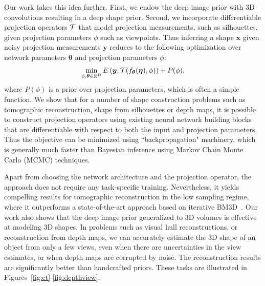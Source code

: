 Our work takes this idea further. First, we endow the deep image prior
with 3D convolutions resulting in a deep shape prior.
Second, we incorporate differentiable projection operators ${\cal T}$ that model
projection measurements, such as silhouettes, given projection
parameters $\phi$ such as viewpoints.
Thus inferring a shape $\bm{x}$ given noisy projection measurements
$\bm{y}$ reduces to the following optimization over network parameters
$\bm{\theta}$ and projection parameters $\phi$:
\begin{equation}
\label{eq:maineq}
	\min_{\phi, \bm{\theta} \in \mathbb{R}^D} E\left(\bm{y}, {\cal T}(f_{\bm{\theta}}(\bm{\eta}), \phi)\right) + P(\phi), 
\end{equation}
where $P(\phi)$ is a prior over projection parameters, which is often
a simple function. We show that for a number of shape construction
problems such as tomographic reconstruction, shape from silhouettes or
depth maps, it is possible to construct projection operators using
existing neural network building blocks that are differentiable with
respect to both the input and projection parameters.
Thus the objective can be minimized using ``backpropagation" machinery, 
which is generally much faster than Bayesian inference using Markov
Chain Monte Carlo (MCMC) techniques.




Apart from choosing the network architecture and the projection
operator, the approach does not require any task-specific training.
Nevertheless, it yields compelling results for tomographic
reconstruction in the low sampling regime, where it outperforms a
state-of-the-art approach based on iterative
BM3D~\cite{maggioni2013nonlocal}.
Our work also shows that the deep image prior generalized to 3D
volumes is effective at modeling 3D shapes.
In problems such as visual hull reconstructions, or reconstruction from
depth maps, we can accurately estimate the 3D shape of an object from
only a few views, even when there are uncertainties in the view
estimates, or when depth maps are corrupted by noise.
The reconstruction results are significantly better than handcrafted priors.
These tasks are illustrated in Figures~\ref{fig:ct}-\ref{fig:depthview}.

